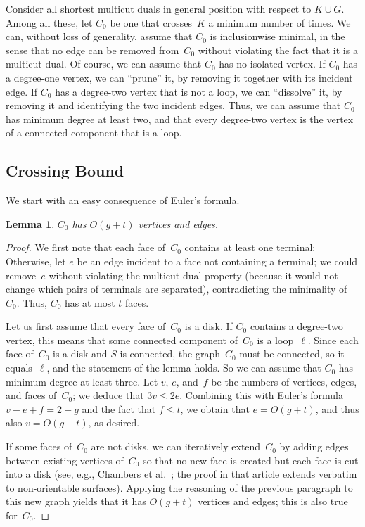 \documentclass[11pt]{article}
\theoremstyle{plain}  \newtheorem{theorem}{Theorem}[section]
\newtheorem{lemma}[theorem]{Lemma}
\theoremstyle{definition}
\begin{document}
Consider all shortest multicut duals in general position with respect to
$K\cup G$.  Among all these, let $C_0$ be one that crosses~$K$ a minimum
number of times.  We can, without loss of generality, assume that $C_0$ is
inclusionwise minimal, in the sense that no edge can be removed from~$C_0$
without violating the fact that it is a multicut dual.  Of course, we can
assume that $C_0$ has no isolated vertex.  If $C_0$ has a degree-one
vertex, we can ``prune'' it, by removing it together with its incident
edge.  If $C_0$ has a degree-two vertex that is not a loop, we can
``dissolve'' it, by removing it and identifying the two incident edges.
Thus, we can assume that $C_0$ has minimum degree at least two, and that
every degree-two vertex is the vertex of a connected component that is a
loop.

\subsection{Crossing Bound}

We start with an easy consequence of Euler's formula.
\begin{lemma}\label{L:sizedual}
  $C_0$ has $O(g+t)$ vertices and edges.
\end{lemma}
\begin{proof}
  We first note that each face of~$C_0$ contains at least one terminal:
  Otherwise, let $e$ be an edge incident to a face not containing a
  terminal; we could remove~$e$ without violating the multicut dual
  property (because it would not change which pairs of terminals are
  separated), contradicting the minimality of~$C_0$.  Thus, $C_0$ has at
  most $t$ faces.

  Let us first assume that every face of~$C_0$ is a disk.  If $C_0$
  contains a degree-two vertex, this means that some connected component
  of~$C_0$ is a loop~$\ell$.  Since each face of~$C_0$ is a disk and $S$ is
  connected, the graph~$C_0$ must be connected, so it equals~$\ell$, and
  the statement of the lemma holds.  So we can assume that $C_0$ has
  minimum degree at least three.  Let $v$, $e$, and~$f$ be the numbers of
  vertices, edges, and faces of~$C_0$; we deduce that $3v\le2e$.  Combining
  this with Euler's formula $v-e+f=2-g$ and the fact that $f\le t$, we
  obtain that $e=O(g+t)$, and thus also $v=O(g+t)$, as desired.

  If some faces of~$C_0$ are not disks, we can iteratively extend~$C_0$ by
  adding edges between existing vertices of~$C_0$ so that no new face is
  created but each face is cut into a disk (see, e.g., Chambers et
  al.~\cite[proof of Lemma~2.1]{ccelw-scsh-08}; the proof in that article
  extends verbatim to non-orientable surfaces).  Applying the reasoning of
  the previous paragraph to this new graph yields that it has $O(g+t)$
  vertices and edges; this is also true for~$C_0$.
\end{proof}
\end{document}

